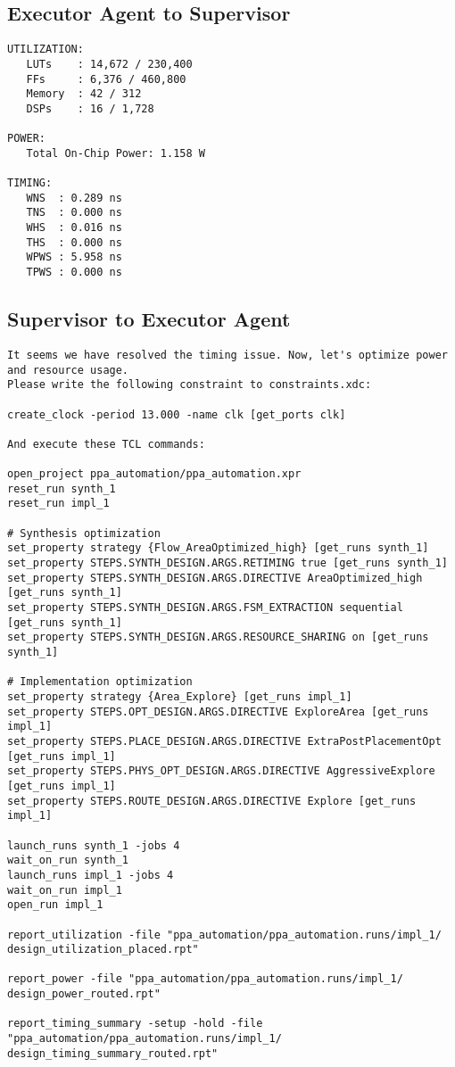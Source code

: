 \subsection{Executor Agent to Supervisor}
\vspace{-0.5em}
\begin{reviewerbox}
\begin{lstlisting}
UTILIZATION:
   LUTs    : 14,672 / 230,400
   FFs     : 6,376 / 460,800
   Memory  : 42 / 312
   DSPs    : 16 / 1,728

POWER:
   Total On-Chip Power: 1.158 W

TIMING:
   WNS  : 0.289 ns
   TNS  : 0.000 ns
   WHS  : 0.016 ns
   THS  : 0.000 ns
   WPWS : 5.958 ns
   TPWS : 0.000 ns
\end{lstlisting}
\end{reviewerbox}


\subsection{Supervisor to Executor Agent}
\vspace{-0.5em}
\begin{supervisorbox}
\begin{lstlisting}
It seems we have resolved the timing issue. Now, let's optimize power and resource usage. 
Please write the following constraint to constraints.xdc:

create_clock -period 13.000 -name clk [get_ports clk]

And execute these TCL commands:

open_project ppa_automation/ppa_automation.xpr
reset_run synth_1
reset_run impl_1

# Synthesis optimization
set_property strategy {Flow_AreaOptimized_high} [get_runs synth_1]
set_property STEPS.SYNTH_DESIGN.ARGS.RETIMING true [get_runs synth_1]
set_property STEPS.SYNTH_DESIGN.ARGS.DIRECTIVE AreaOptimized_high [get_runs synth_1]
set_property STEPS.SYNTH_DESIGN.ARGS.FSM_EXTRACTION sequential [get_runs synth_1]
set_property STEPS.SYNTH_DESIGN.ARGS.RESOURCE_SHARING on [get_runs synth_1]

# Implementation optimization
set_property strategy {Area_Explore} [get_runs impl_1]
set_property STEPS.OPT_DESIGN.ARGS.DIRECTIVE ExploreArea [get_runs impl_1]
set_property STEPS.PLACE_DESIGN.ARGS.DIRECTIVE ExtraPostPlacementOpt [get_runs impl_1]
set_property STEPS.PHYS_OPT_DESIGN.ARGS.DIRECTIVE AggressiveExplore [get_runs impl_1]
set_property STEPS.ROUTE_DESIGN.ARGS.DIRECTIVE Explore [get_runs impl_1]

launch_runs synth_1 -jobs 4
wait_on_run synth_1
launch_runs impl_1 -jobs 4
wait_on_run impl_1
open_run impl_1

report_utilization -file "ppa_automation/ppa_automation.runs/impl_1/
design_utilization_placed.rpt"

report_power -file "ppa_automation/ppa_automation.runs/impl_1/
design_power_routed.rpt"

report_timing_summary -setup -hold -file "ppa_automation/ppa_automation.runs/impl_1/
design_timing_summary_routed.rpt"
\end{lstlisting}
\end{supervisorbox}

